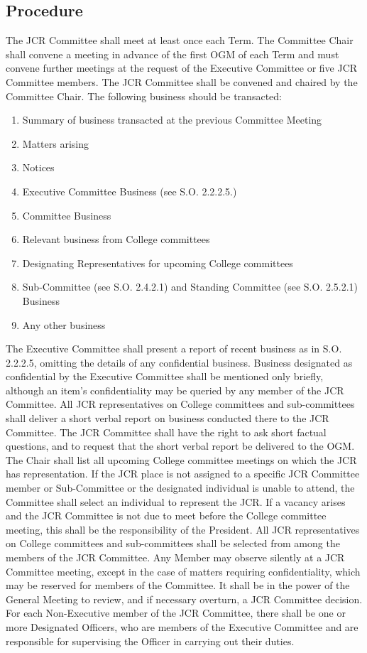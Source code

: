 \subsection{Procedure}
\npara The JCR Committee shall meet at least once each Term. The Committee Chair shall convene a meeting in advance of the first OGM of each Term and must convene further meetings at the request of the Executive Committee or five JCR Committee members.
\npara The JCR Committee shall be convened and chaired by the Committee Chair.
\npara \label{transacted_business}The following business should be transacted:
\begin{enumerate}
	\item Summary of business transacted at the previous Committee Meeting
	\item Matters arising
	\item Notices
	\item \label{exec_business}Executive Committee Business (see S.O. 2.2.2.5.)
	\item Committee Business
	\item Relevant business from College committees
	\item Designating Representatives for upcoming College committees
	\item Sub-Committee (see S.O. 2.4.2.1) and Standing Committee (see S.O. 2.5.2.1) Business
	\item Any other business
\end{enumerate}
\npara The Executive Committee shall present a report of recent business as in S.O. 2.2.2.5, omitting the details of any confidential business.
Business designated as confidential by the Executive Committee shall be mentioned only briefly, although an item's confidentiality may be queried by any member of the JCR Committee.
\npara All JCR representatives on College committees and sub-committees shall deliver a short verbal report on business conducted there to the JCR Committee.
The JCR Committee shall have the right to ask short factual questions, and to request that the short verbal report be delivered to the OGM.
\npara The Chair shall list all upcoming College committee meetings on which the JCR has representation.
If the JCR place is not assigned to a specific JCR Committee member or Sub-Committee or the designated individual is unable to attend, the Committee shall select an individual to represent the JCR.
If a vacancy arises and the JCR Committee is not due to meet before the College committee meeting, this shall be the responsibility of the President.
All JCR representatives on College committees and sub-committees shall be selected from among the members of the JCR Committee.
\npara Any Member may observe silently at a JCR Committee meeting, except in the case of matters requiring confidentiality, which may be reserved for members of the Committee.
\npara It shall be in the power of the General Meeting to review, and if necessary overturn, a JCR Committee decision.
\npara For each Non-Executive member of the JCR Committee, there shall be one or more Designated Officers, who are members of the Executive Committee and are responsible for supervising the Officer in carrying out their duties.
